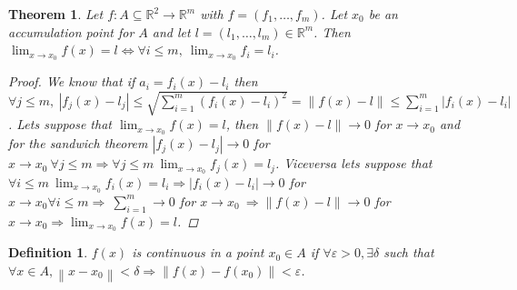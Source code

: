 \documentclass{article}
\newtheorem{theorem}{Theorem}
\newtheorem{definition}{Definition}
\begin{document}
            \begin{theorem}
                Let $f:A\subseteq \mathbb{R}^2 \rightarrow \mathbb{R}^m$ with $f=(f_1,\dots,f_m)$. Let $x_0$ be an accumulation point for $A$ and let $l = (l_1,\dots,l_m) \in \mathbb{R}^m$. Then $\lim_{x \to x_0}f(x) = l \Longleftrightarrow  \forall i \leq m, \ \lim_{x \to x_0}f_i = l_i$.
                \begin{proof}
                    We know that if $a_i = f_i(x) - l_i$ then $\forall j \leq m, \ \left\lvert f_j(x) - l_j\right\rvert \leq \sqrt{\sum_{i = 1}^{m} \left(f_i(x) - l_i\right)^2 } = \left\lVert f(x) - l\right\rVert \leq \sum_{i = 1}^{m} \left\lvert f_i(x) - l_i\right\rvert$. Lets suppose that $\lim_{x \to x_0} f(x) = l$, then $\left\lVert f(x) - l\right\rVert \to 0 $ for $x \to x_0$ and for the sandwich theorem $\left\lvert f_j (x) - l_j \right\rvert \to 0 $ for $x \to x_0 \ \forall j \leq m \Longrightarrow \forall j \leq m \ \lim_{x \to x_0 }f_j(x) = l_j$. Viceversa lets suppose that $\forall i \leq m \ \lim_{x \to x_0} f_i( x) = l_i \Rightarrow \left\lvert f_i (x) - l_i\right\rvert \to 0 $ for $x \to x_0 \forall i \leq m \Rightarrow \ \sum_{i = 1}^{m} \to 0$ for $x \to x_0 \ \Rightarrow \left\lVert f(x) - l\right\rVert \to 0 $ for $x \to x_0 \Rightarrow \lim_{x \to x_0}f(x) = l$.  
                \end{proof}
            \end{theorem}
            \begin{definition}
                $f(x)$ is continuous in a point $x_0 \in A$ if $\forall \varepsilon > 0, \exists \delta$ such that $\forall x \in A,  \left\lVert x - x_0\right\rVert < \delta \Rightarrow \left\lVert f(x) - f(x_0) \right\rVert < \varepsilon$.
            \end{definition}
            \newpage
\end{document}
